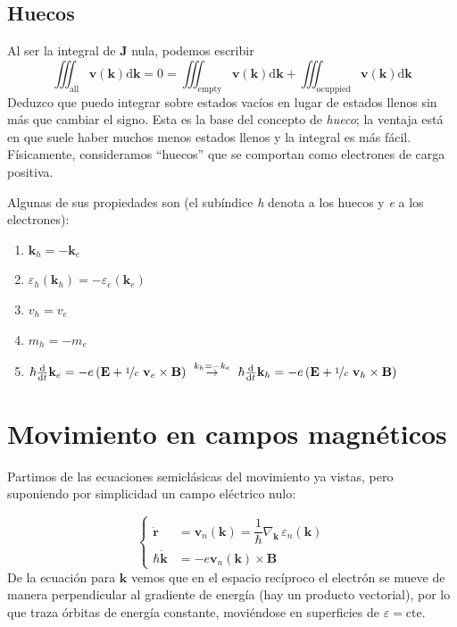 \subsection{Huecos}
Al ser la integral de $\mathbf{J}$ nula, podemos escribir
\begin{equation}
  \iiint_\text{all} \mathbf{v}(\mathbf{k}) \text{d}\mathbf{k} =
  0 = \iiint_\text{empty} \mathbf{v}(\mathbf{k})
  \text{d}\mathbf{k} + \iiint_\text{ocuppied} \mathbf{v}(\mathbf{k}) \text{d}\mathbf{k}
\end{equation}
Deduzco que puedo integrar sobre estados vacíos en lugar de estados
llenos sin más que cambiar el signo. Esta es la base del concepto de
\emph{hueco}; la ventaja está en que suele haber muchos menos estados
llenos y la integral es más fácil. Físicamente, consideramos
``huecos'' que se comportan como electrones de carga positiva.

Algunas de sus propiedades son (el subíndice \emph{h} denota a los
huecos y \emph{e} a los electrones):
\begin{enumerate}
\item $\mathbf{k}_h = - \mathbf{k}_e$
\item $\varepsilon_h (\mathbf{k}_h) = -\varepsilon_e (\mathbf{k}_e)$
\item $v_h = v_e$
\item $m_h = -m_e$
\item
  $\hbar \frac{\text{d}}{\text{d} t} \mathbf{k}_e = - e \left(
    \mathbf{E} + \nicefrac{1}{c}\ \mathbf{v}_e \times \mathbf{B}
  \right) \ \stackrel{k_h = -k_e}{\rightarrow} \ \hbar
  \frac{\text{d}}{\text{d} t} \mathbf{k}_h = - e \left( \mathbf{E} +
    \nicefrac{1}{c}\ \mathbf{v}_h \times \mathbf{B} \right)$
\end{enumerate}

\section{Movimiento en campos magnéticos}
Partimos de las ecuaciones semiclásicas del movimiento ya vistas, pero
suponiendo por simplicidad un campo eléctrico nulo:

\begin{equation}
\label{eq:sistemachungo}
  \begin{cases}
    \dot{ \mathbf{r} } &= \mathbf{v}_n(\mathbf{k}) = \dfrac{1}{\hbar} \nabla _\mathbf{k} \,
    \varepsilon_n (\mathbf{k}) \\
    \hbar \dot{\mathbf{k}} &= - e \mathbf{v}_n (\mathbf{k}) \times \mathbf{B}
  \end{cases}
\end{equation}
De la ecuación para $\mathbf{k}$ vemos que en el espacio recíproco el
electrón se mueve de manera perpendicular al gradiente de energía (hay
un producto vectorial), por lo que traza órbitas de energía constante,
moviéndose en superficies de $\varepsilon = \text{cte.}$

